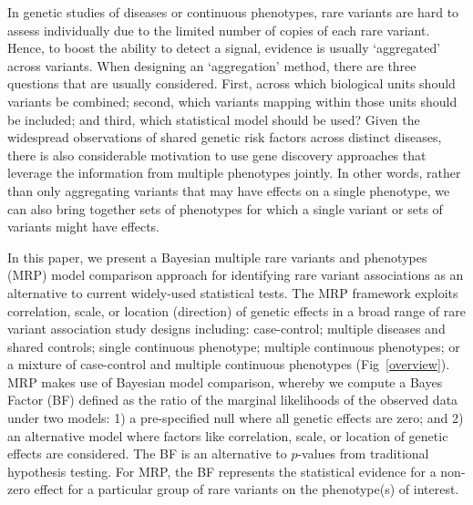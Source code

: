 In genetic studies of diseases or continuous phenotypes, rare variants are hard to assess individually due to the limited number of copies of each rare variant. Hence, to boost the ability to detect a signal, evidence is usually `aggregated' across variants. When designing an `aggregation' method, there are three questions that are usually considered. First, across which biological units should variants be combined; second, which variants mapping within those units should be included\cite{majithia2014rare}; and third, which statistical model should be used\cite{lee2014rare}? Given the widespread observations of shared genetic risk factors across distinct diseases, there is also considerable motivation to use gene discovery approaches that leverage the information from multiple phenotypes jointly. In other words, rather than only aggregating variants that may have effects on a single phenotype, we can also bring together sets of phenotypes for which a single variant or sets of variants might have effects. 

In this paper, we present a Bayesian multiple rare variants and phenotypes (MRP) model comparison approach for identifying rare variant associations as an alternative to current widely-used statistical tests. The MRP framework exploits correlation, scale, or location (direction) of genetic effects in a broad range of rare variant association study designs including: case-control; multiple diseases and shared controls; single continuous phenotype; multiple continuous phenotypes; or a mixture of case-control and multiple continuous phenotypes (Fig~\ref{overview}). MRP makes use of Bayesian model comparison, whereby we compute a Bayes Factor (BF) defined as the ratio of the marginal likelihoods of the observed data under two models: 1) a pre-specified null where all genetic effects are zero; and 2) an alternative model where factors like correlation, scale, or location of genetic effects are considered. The BF is an alternative to $p$-values from traditional hypothesis testing. For MRP, the BF represents the statistical evidence for a non-zero effect for a particular group of rare variants on the phenotype(s) of interest.

